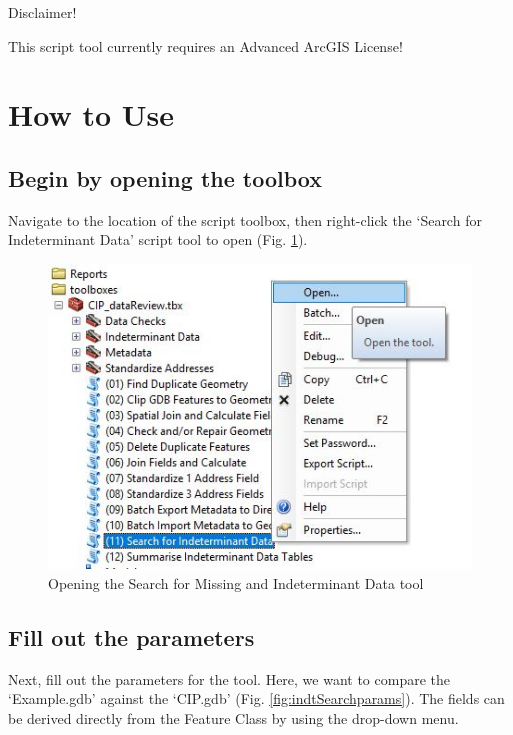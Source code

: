 \documentclass[openany]{book}
\theoremstyle{definition}
\theoremstyle{definition}
\theoremstyle{definition}
\theoremstyle{remark}
\let\BeginKnitrBlock\begin \let\EndKnitrBlock\end
\begin{document}
\BeginKnitrBlock{warnh1}
Disclaimer!
\EndKnitrBlock{warnh1} \BeginKnitrBlock{warnp}

This script tool currently requires an Advanced ArcGIS License!
\EndKnitrBlock{warnp}

\section{How to Use}\label{how-to-use-8}

\subsection{Begin by opening the
toolbox}\label{begin-by-opening-the-toolbox-8}

Navigate to the location of the script toolbox, then right-click the
`Search for Indeterminant Data' script tool to open (Fig.
\ref{fig:indtSearchopen}).

\begin{figure}[H]

{\centering \includegraphics{figures/indtSearch-open} 

}

\caption{Opening the Search for Missing and Indeterminant Data tool}\label{fig:indtSearchopen}
\end{figure}

\subsection{Fill out the parameters}\label{fill-out-the-parameters-8}

Next, fill out the parameters for the tool. Here, we want to compare the
`Example.gdb' against the `CIP.gdb' (Fig. \ref{fig:indtSearchparams}).
The fields can be derived directly from the Feature Class by using the
drop-down menu.
\end{document}
